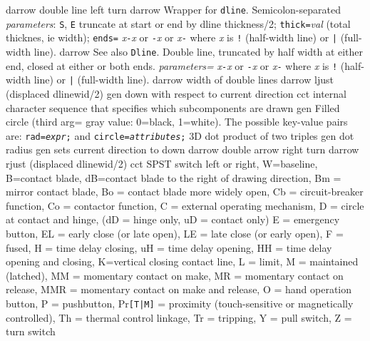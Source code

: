   {darrow}
  {double line left turn}
  {darrow}
  {Wrapper for {\tt dline}.
  Semicolon-separated {\sl parameters}:
    {\tt S}, {\tt E} truncate at start or end by dline thickness/2;
    {\tt thick=}{\sl val}   (total thicknes, ie width);
    {\tt ends=}
      {\sl x}{\tt -}{\sl x} or
      {\tt -}{\sl x} or
      {\sl x}{\tt -} where {\sl x} is {\tt !} (half-width line)
       or {\tt |} (full-width line).}
  {darrow}
  {See also {\tt Dline}.
   Double line, truncated by half width at either end, closed
    at either or both ends.
   {\sl parameters=}
      {\sl x}{\tt -}{\sl x} or
      {\tt -}{\sl x} or
      {\sl x}{\tt -} where {\sl x} is {\tt !} (half-width line)
       or {\tt |} (full-width line).}
  {darrow}
  {width of double lines}
  {darrow}
  {ljust (displaced dlinewid/2)}
  {gen}
  {down with respect to current direction}
  {cct}
  {internal character sequence that specifies which subcomponents are drawn}
  {gen}
  {Filled circle (third arg= gray value: 0=black, 1=white). The possible
   key-value pairs are:
    {\tt rad={\sl expr};} and
    {\tt circle={\sl attributes};} }
  {3D}
  {dot product of two triples}
  {gen}
  {dot radius}
  {gen}
  {sets current direction to down }
  {darrow}
  {double arrow right turn}
  {darrow}
  {rjust (displaced dlinewid/2)}
  {cct}
  {SPST switch left or right, W=baseline, B=contact blade,
    dB=contact blade to the right of drawing direction,
         Bm = mirror contact blade,
         Bo = contact blade more widely open,
         Cb = circuit-breaker function,
         Co = contactor function,
         C = external operating mechanism,
         D = circle at contact and hinge,
             (dD = hinge only, uD = contact only)
         E = emergency button,
         EL = early close (or late open),
         LE = late close (or early open),
         F = fused,
         H = time delay closing,
         uH = time delay opening,
         HH = time delay opening and closing,
         K=vertical closing contact line,
         L = limit,
         M = maintained (latched),
         MM = momentary contact on make,
         MR = momentary contact on release,
         MMR = momentary contact on make and release,
         O = hand operation button,
         P = pushbutton,
         Pr{\tt [T|M]} = proximity (touch-sensitive or magnetically controlled),
         Th = thermal control linkage,
         Tr = tripping,
         Y = pull switch,
         Z = turn switch
   }
